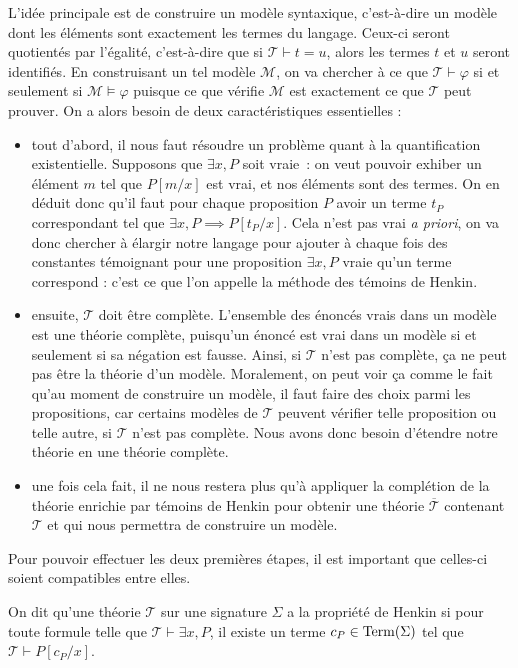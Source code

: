 L'idée principale est de construire un modèle syntaxique, c'est-à-dire un modèle
dont les éléments sont exactement les termes du langage. Ceux-ci seront
quotientés par l'égalité, c'est-à-dire que si $\mathcal T \vdash t = u$, alors
les termes $t$ et $u$ seront identifiés. En construisant un tel modèle
$\mathcal M$, on va chercher à ce que $\mathcal T \vdash \varphi$ si et
seulement si $\mathcal M\vDash \varphi$ puisque ce que vérifie $\mathcal M$ est
exactement ce que $\mathcal T$ peut prouver. On a alors besoin de deux
caractéristiques essentielles :
\begin{itemize}
\item tout d'abord, il nous faut résoudre un problème quant à la quantification
  existentielle. Supposons que $\exists x,P$ soit vraie~: on veut pouvoir
  exhiber un élément $m$ tel que $P[m/x]$ est vrai, et nos éléments sont des
  termes. On en déduit donc qu'il faut pour chaque proposition $P$ avoir un
  terme $t_P$ correspondant tel que $\exists x, P \implies P[t_P/x]$. Cela n'est
  pas vrai \textit{a priori}, on va donc chercher à élargir notre langage pour
  ajouter à chaque fois des constantes témoignant pour une proposition
  $\exists x,P$ vraie qu'un terme correspond : c'est ce que l'on appelle la
  méthode des témoins de Henkin.
\item ensuite, $\mathcal T$ doit être complète. L'ensemble des énoncés
  vrais dans un modèle est une théorie complète, puisqu'un énoncé est vrai dans
  un modèle si et seulement si sa négation est fausse. Ainsi, si $\mathcal T$
  n'est pas complète, ça ne peut pas être la théorie d'un modèle. Moralement, on
  peut voir ça comme le fait qu'au moment de construire un modèle, il faut faire
  des choix parmi les propositions, car certains modèles de $\mathcal T$ peuvent
  vérifier telle proposition ou telle autre, si $\mathcal T$ n'est pas complète.
  Nous avons donc besoin d'étendre notre théorie en une théorie complète.
\item une fois cela fait, il ne nous restera plus qu'à appliquer la complétion
  de la théorie enrichie par témoins de Henkin pour obtenir une théorie
  $\overline{\mathcal T}$ contenant $\mathcal T$ et qui nous permettra de
  construire un modèle.
\end{itemize}

Pour pouvoir effectuer les deux premières étapes, il est important que celles-ci
soient compatibles entre elles.

\begin{definition}
  On dit qu'une théorie $\mathcal T$ sur une signature $\Sigma$ a la propriété
  de Henkin si pour toute formule telle que $\mathcal T\vdash\exists x, P$, il
  existe un terme $c_P\in\operatorname{Term}(\Sigma)$ tel que $\mathcal T\vdash P[c_P/x]$.
\end{definition}

